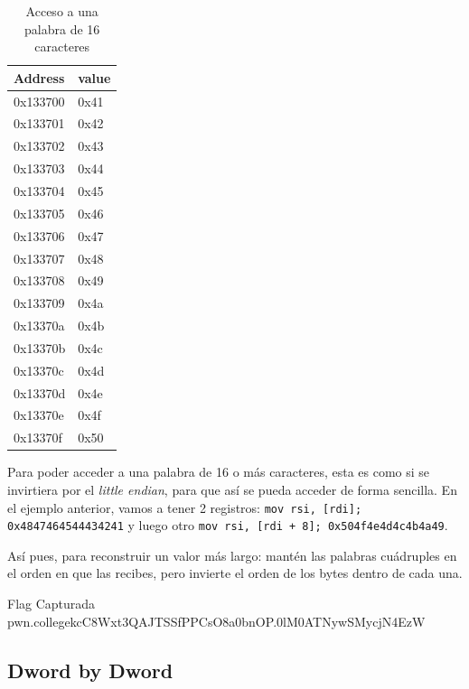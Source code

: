 \begin{table}[htbp]
	\begin{center}
		\begin{tabular}[c]{l|l}
			\hline
			Address  & value \\
			\hline
			0x133700 & 0x41  \\
			\hline
			0x133701 & 0x42  \\
			\hline
			0x133702 & 0x43  \\
			\hline
			0x133703 & 0x44  \\
			\hline
			0x133704 & 0x45  \\
			\hline
			0x133705 & 0x46  \\
			\hline
			0x133706 & 0x47  \\
			\hline
			0x133707 & 0x48  \\
			\hline
			0x133708 & 0x49  \\
			\hline
			0x133709 & 0x4a  \\
			\hline
			0x13370a & 0x4b  \\
			\hline
			0x13370b & 0x4c  \\
			\hline
			0x13370c & 0x4d  \\
			\hline
			0x13370d & 0x4e  \\
			\hline
			0x13370e & 0x4f  \\
			\hline
			0x13370f & 0x50  \\
			\hline
		\end{tabular}
	\end{center}
	\caption{Acceso a una palabra de 16 caracteres}\label{tab:access_word_16_characters}
\end{table}

Para poder acceder a una palabra de 16 o más caracteres, esta es como si se invirtiera
por el \textit{little endian}, para que así se pueda acceder de forma sencilla.
En el ejemplo anterior, vamos a tener 2 registros: \texttt{mov rsi, [rdi]; 0x4847464544434241}
y luego otro \texttt{mov rsi, [rdi + 8]; 0x504f4e4d4c4b4a49}.

Así pues, para reconstruir un valor más largo: mantén las palabras cuádruples
en el orden en que las recibes, pero invierte el orden de los bytes dentro de cada una.

\begin{flagbox}{Flag Capturada}
	pwn.college{kcC8Wxt3QAJTSSfPPCsO8a0bnOP.0lM0ATNywSMycjN4EzW}
\end{flagbox}

\subsection{Dword by Dword}\label{subsec:dword_by_dword}

